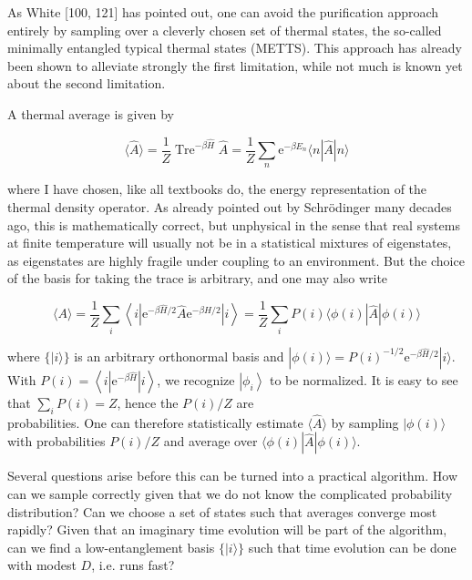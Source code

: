 \documentclass[12pt]{article}
\begin{document}
As White [100, 121] has pointed out, one can avoid the purification approach entirely by sampling over a cleverly chosen set of thermal states, the so-called minimally entangled typical thermal states (METTS). This approach has already been shown to alleviate strongly the first limitation, while not much is known yet about the second limitation.

A thermal average is given by


\begin{equation*}
\langle\hat{A}\rangle=\frac{1}{Z} \operatorname{Tre}^{-\beta \hat{H}} \hat{A}=\frac{1}{Z} \sum_{n} \mathrm{e}^{-\beta E_{n}}\langle n|\hat{A}| n\rangle \tag{300}
\end{equation*}


where I have chosen, like all textbooks do, the energy representation of the thermal density operator. As already pointed out by Schrödinger many decades ago, this is mathematically correct, but unphysical in the sense that real systems at finite temperature will usually not be in a statistical mixtures of eigenstates, as eigenstates are highly fragile under coupling to an environment. But the choice of the basis for taking the trace is arbitrary, and one may also write


\begin{equation*}
\langle A\rangle=\frac{1}{Z} \sum_{i}\left\langle i\left|\mathrm{e}^{-\beta \hat{H} / 2} \hat{A} \mathrm{e}^{-\beta \hat{H} / 2}\right| i\right\rangle=\frac{1}{Z} \sum_{i} P(i)\langle\phi(i)|\hat{A}| \phi(i)\rangle \tag{301}
\end{equation*}


where $\{|i\rangle\}$ is an arbitrary orthonormal basis and $|\phi(i)\rangle=P(i)^{-1 / 2} \mathrm{e}^{-\beta \hat{H} / 2}|i\rangle$. With $P(i)=\left\langle i\left|\mathrm{e}^{-\beta \hat{H}}\right| i\right\rangle$, we recognize $\left|\phi_{i}\right\rangle$ to be normalized. It is easy to see that $\sum_{i} P(i)=Z$, hence the $P(i) / Z$ are\\
probabilities. One can therefore statistically estimate $\langle\hat{A}\rangle$ by sampling $|\phi(i)\rangle$ with probabilities $P(i) / Z$ and average over $\langle\phi(i)|\hat{A}| \phi(i)\rangle$.

Several questions arise before this can be turned into a practical algorithm. How can we sample correctly given that we do not know the complicated probability distribution? Can we choose a set of states such that averages converge most rapidly? Given that an imaginary time evolution will be part of the algorithm, can we find a low-entanglement basis $\{|i\rangle\}$ such that time evolution can be done with modest $D$, i.e. runs fast?
\end{document}
